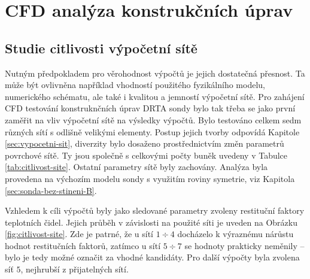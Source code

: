 \section{CFD analýza konstrukčních úprav} \label{sec:konstrukcni-upravy}    
    \subsection{Studie citlivosti výpočetní sítě}
        Nutným předpokladem pro věrohodnost výpočtů je jejich dostatečná přesnost. Ta může být ovlivněna například vhodností použitého fyzikálního modelu, numerického schématu, ale také i kvalitou a jemností výpočetní sítě. Pro zahájení CFD testování konstruknčních úprav DRTA sondy bylo tak třeba se jako první zaměřit na vliv výpočetní sítě na výsledky výpočtů. Bylo testováno celkem sedm různých sítí s odlišně velikými elementy. Postup jejich tvorby odpovídá Kapitole \ref{sec:vypocetni-sit}, diverzity bylo dosaženo prostřednictvím změn parametrů povrchové sítě. Ty jsou společně s celkovými počty buněk uvedeny v Tabulce \ref{tab:citlivost-site}. Ostatní parametry sítě byly zachovány. Analýza byla provedena na výchozím modelu sondy s využitím roviny symetrie, viz Kapitola \ref{sec:sonda-bez-stineni-B}.

        \begin{table}[ht!]
            \centering
            \caption{Parametry síťování pro citlivostní analýzu sítě.}
            \label{tab:citlivost-site}
            \end{table}

        Vzhledem k cíli výpočtů byly jako sledované parametry zvoleny restituční faktory teplotních čidel. Jejich průběh v závislosti na použité síti je uveden na Obrázku \ref{fig:citlivost-site}. Zde je patrné, že u sítí $1 \div 4$ docházelo k výraznému nárůstu hodnot restitučních faktorů, zatímco u sítí $5 \div 7$ se hodnoty prakticky neměnily – bylo je tedy možné označit za vhodné kandidáty. Pro další výpočty byla zvolena síť $5$, nejhrubší z přijatelných sítí.

